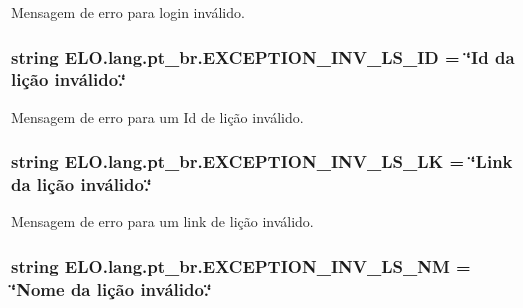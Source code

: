 Mensagem de erro para login inválido. 

\hypertarget{namespaceELO_1_1lang_1_1pt__br_a4cb871dfcc7ccbcb5d6c9fb79d5cccd2}{
\subsubsection[{E\-X\-C\-E\-P\-T\-I\-O\-N\-\_\-\-I\-N\-V\-\_\-\-L\-S\-\_\-\-I\-D}]{\setlength{\rightskip}{0pt plus 5cm}string E\-L\-O.\-lang.\-pt\-\_\-br.\-E\-X\-C\-E\-P\-T\-I\-O\-N\-\_\-\-I\-N\-V\-\_\-\-L\-S\-\_\-\-I\-D = \char`\"{}Id da lição inválido.\char`\"{}}}\label{d5/d70/namespaceELO_1_1lang_1_1pt__br_a4cb871dfcc7ccbcb5d6c9fb79d5cccd2}


Mensagem de erro para um Id de lição inválido. 

\hypertarget{namespaceELO_1_1lang_1_1pt__br_a589fee1f3bb945bc031bbd6c0c569c09}{
\subsubsection[{E\-X\-C\-E\-P\-T\-I\-O\-N\-\_\-\-I\-N\-V\-\_\-\-L\-S\-\_\-\-L\-K}]{\setlength{\rightskip}{0pt plus 5cm}string E\-L\-O.\-lang.\-pt\-\_\-br.\-E\-X\-C\-E\-P\-T\-I\-O\-N\-\_\-\-I\-N\-V\-\_\-\-L\-S\-\_\-\-L\-K = \char`\"{}Link da lição inválido.\char`\"{}}}\label{d5/d70/namespaceELO_1_1lang_1_1pt__br_a589fee1f3bb945bc031bbd6c0c569c09}


Mensagem de erro para um link de lição inválido. 

\hypertarget{namespaceELO_1_1lang_1_1pt__br_a72209416e042d08c26b622b627159447}{
\subsubsection[{E\-X\-C\-E\-P\-T\-I\-O\-N\-\_\-\-I\-N\-V\-\_\-\-L\-S\-\_\-\-N\-M}]{\setlength{\rightskip}{0pt plus 5cm}string E\-L\-O.\-lang.\-pt\-\_\-br.\-E\-X\-C\-E\-P\-T\-I\-O\-N\-\_\-\-I\-N\-V\-\_\-\-L\-S\-\_\-\-N\-M = \char`\"{}Nome da lição inválido.\char`\"{}}}\label{d5/d70/namespaceELO_1_1lang_1_1pt__br_a72209416e042d08c26b622b627159447}


